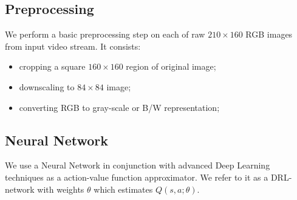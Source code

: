 \documentclass[a4paper,oneside,dvipsnames]{article}
\begin{document}
\subsection[Preprocessing]{Preprocessing}
We perform a basic preprocessing step on each of raw $210 \times 160$ RGB images from input video stream. It consists:
\begin{itemize}
    \item cropping a square $160 \times 160$ region of original image;
    \item downscaling to $84 \times 84$ image;
    \item converting RGB to gray-scale or B/W representation;
\end{itemize}

\subsection[Neural Network]{Neural Network}
We use a Neural Network in conjunction with advanced Deep Learning techniques as a action-value function approximator. We refer to it as a DRL-network with weights $\theta$ which estimates $Q(s,a;\theta)$.
\end{document}

